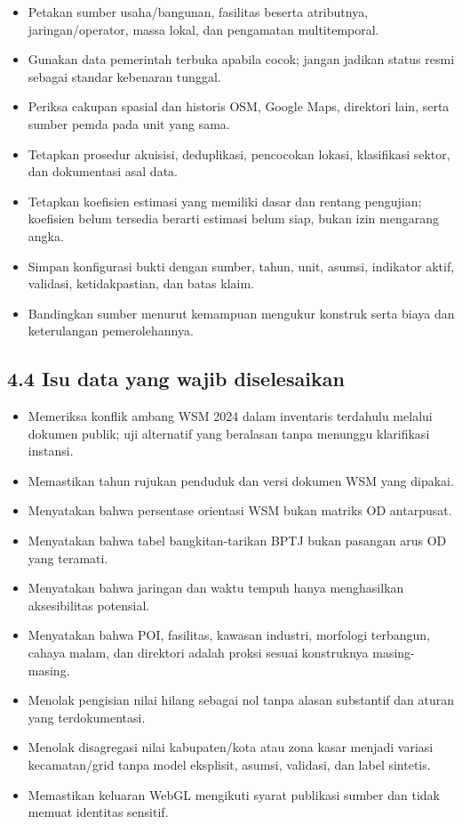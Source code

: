 \documentclass[
  indonesian,
  11pt,
]{article}
\providecommand{\tightlist}{%
  \setlength{\itemsep}{0pt}\setlength{\parskip}{0pt}}
\renewcommand{\tightlist}{%
  \setlength{\itemsep}{0.22em}%
  \setlength{\parskip}{0pt}%
}
\begin{document}
\begin{itemize}
\tightlist
\item[$\square$]
  Petakan sumber usaha/bangunan, fasilitas beserta atributnya,
  jaringan/operator, massa lokal, dan pengamatan multitemporal.
\item[$\square$]
  Gunakan data pemerintah terbuka apabila cocok; jangan jadikan status
  resmi sebagai standar kebenaran tunggal.
\item[$\square$]
  Periksa cakupan spasial dan historis OSM, Google Maps, direktori lain,
  serta sumber pemda pada unit yang sama.
\item[$\square$]
  Tetapkan prosedur akuisisi, deduplikasi, pencocokan lokasi,
  klasifikasi sektor, dan dokumentasi asal data.
\item[$\square$]
  Tetapkan koefisien estimasi yang memiliki dasar dan rentang pengujian;
  koefisien belum tersedia berarti estimasi belum siap, bukan izin
  mengarang angka.
\item[$\square$]
  Simpan konfigurasi bukti dengan sumber, tahun, unit, asumsi, indikator
  aktif, validasi, ketidakpastian, dan batas klaim.
\item[$\square$]
  Bandingkan sumber menurut kemampuan mengukur konstruk serta biaya dan
  keterulangan pemerolehannya.
\end{itemize}

\subsection{4.4 Isu data yang wajib
diselesaikan}\label{isu-data-yang-wajib-diselesaikan}

\begin{itemize}
\tightlist
\item[$\square$]
  Memeriksa konflik ambang WSM 2024 dalam inventaris terdahulu melalui
  dokumen publik; uji alternatif yang beralasan tanpa menunggu
  klarifikasi instansi.
\item[$\square$]
  Memastikan tahun rujukan penduduk dan versi dokumen WSM yang dipakai.
\item[$\square$]
  Menyatakan bahwa persentase orientasi WSM bukan matriks OD antarpusat.
\item[$\square$]
  Menyatakan bahwa tabel bangkitan-tarikan BPTJ bukan pasangan arus OD
  yang teramati.
\item[$\square$]
  Menyatakan bahwa jaringan dan waktu tempuh hanya menghasilkan
  aksesibilitas potensial.
\item[$\square$]
  Menyatakan bahwa POI, fasilitas, kawasan industri, morfologi
  terbangun, cahaya malam, dan direktori adalah proksi sesuai
  konstruknya masing-masing.
\item[$\square$]
  Menolak pengisian nilai hilang sebagai nol tanpa alasan substantif dan
  aturan yang terdokumentasi.
\item[$\square$]
  Menolak disagregasi nilai kabupaten/kota atau zona kasar menjadi
  variasi kecamatan/grid tanpa model eksplisit, asumsi, validasi, dan
  label sintetis.
\item[$\square$]
  Memastikan keluaran WebGL mengikuti syarat publikasi sumber dan tidak
  memuat identitas sensitif.
\end{itemize}
\end{document}
